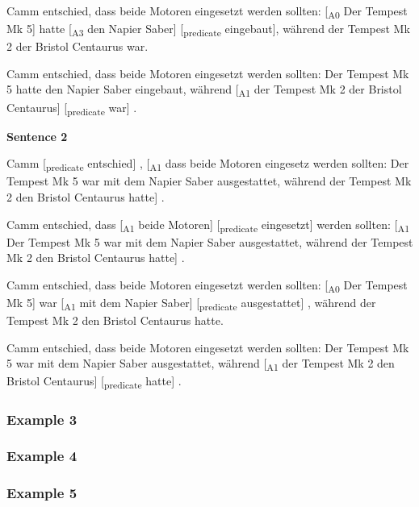 \begin{landscape}
Camm entschied, dass beide Motoren eingesetzt werden sollten: [\textsubscript{A0} Der Tempest Mk 5] hatte [\textsubscript{A3} den Napier Saber] [\textsubscript{predicate} eingebaut], während der Tempest Mk 2 der Bristol Centaurus war.

Camm entschied, dass beide Motoren eingesetzt werden sollten: Der Tempest Mk 5 hatte den Napier Saber eingebaut, während [\textsubscript{A1} der Tempest Mk 2 der Bristol Centaurus] [\textsubscript{predicate} war] .

\textbf{Sentence 2}

Camm [\textsubscript{predicate} entschied] , [\textsubscript{A1} dass beide Motoren eingesetz werden sollten: Der Tempest Mk 5 war mit dem Napier Saber ausgestattet, während der Tempest Mk 2 den Bristol Centaurus hatte] .

Camm entschied, dass [\textsubscript{A1} beide Motoren] [\textsubscript{predicate} eingesetzt] werden sollten: [\textsubscript{A1} Der Tempest Mk 5 war mit dem Napier Saber ausgestattet, während der Tempest Mk 2 den Bristol Centaurus hatte] .

Camm entschied, dass beide Motoren eingesetzt werden sollten: [\textsubscript{A0} Der Tempest Mk 5] war [\textsubscript{A1} mit dem Napier Saber] [\textsubscript{predicate} ausgestattet] , während der Tempest Mk 2 den Bristol Centaurus hatte.

Camm entschied, dass beide Motoren eingesetzt werden sollten: Der Tempest Mk 5 war mit dem Napier Saber ausgestattet, während [\textsubscript{A1} der Tempest Mk 2 den Bristol Centaurus] [\textsubscript{predicate} hatte] .


\end{landscape}

\subsubsection{Example 3}


\subsubsection{Example 4}


\subsubsection{Example 5}

